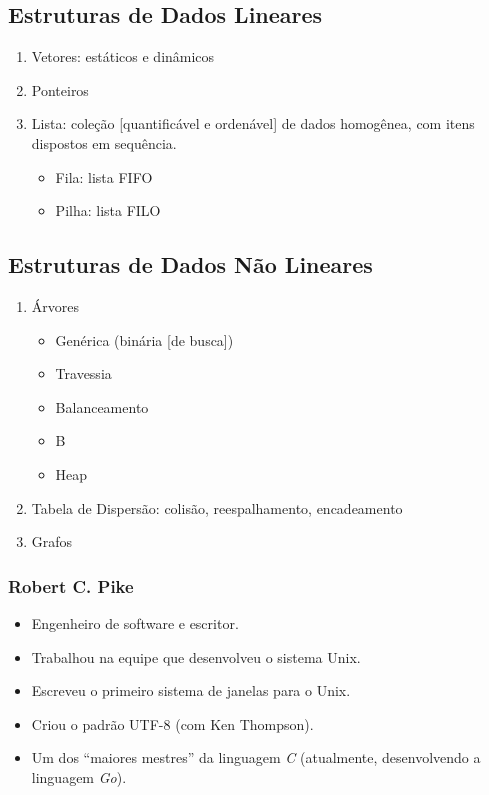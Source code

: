\documentclass{UnBeamer}
\begin{document}
	\subsection{Estruturas de Dados Lineares}
	\begin{frame}[label=main]
		\Large
		\begin{enumerate}[<+->]
			\setlength{\itemsep}{\baselineskip}
			\item Vetores: estáticos e dinâmicos
			\item Ponteiros
			\item Lista: coleção [quantificável e ordenável] de dados homogênea, 
			com itens dispostos em sequência.
				\begin{itemize}
					\Large
					\item Fila: lista FIFO
					\item Pilha: lista FILO
				\end{itemize}
		\end{enumerate}
	\end{frame}

	\subsection{Estruturas de Dados Não Lineares}
	\begin{frame}[label=main]
		\Large
		\begin{enumerate}[<+->]
			\setlength{\itemsep}{\baselineskip}
			\item Árvores
				\begin{itemize}
					\Large
					\item Genérica (binária [de busca])
					\item Travessia
					\item Balanceamento
					\item B
					\item Heap
				\end{itemize}
			\item Tabela de Dispersão: colisão, reespalhamento, encadeamento
			\item Grafos
		\end{enumerate}
	\end{frame}

	\begin{frame}[label=main]
		\frametitle{Robert C. Pike}
		\begin{itemize}
			\item Engenheiro de software e escritor.
			\item Trabalhou na equipe que desenvolveu o sistema Unix.
			\item Escreveu o primeiro sistema de janelas para o Unix.
			\item Criou o padrão UTF-8 (com Ken Thompson).
			\item Um dos ``maiores mestres'' da linguagem \emph{C} (atualmente, 
			desenvolvendo a linguagem \emph{Go}).
		\end{itemize}
	\end{frame}
\end{document}
